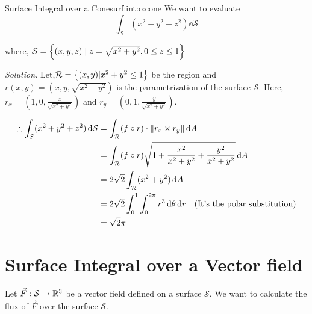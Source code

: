 \documentclass[../Analysis-3.tex]{subfiles}
\begin{document}
\begin{Eg}{Surface Integral over a Cone}{surf:int:o:cone}
  We want to evaluate \[ \int_{\mathcal{S}}(x^2+y^2+z^2) \dd \mathcal{S}\]

  where, $\mathcal{S} = \qty{(x,y,z) \mid z = \sqrt{x^2 + y^2},0 \le z \le 1}$

  \textit{Solution.} Let,$\mathcal{R} = \qty{(x,y)| x^2+y^2 \le 1}$ be the region and $r(x,y) = \left( x,y,\sqrt{x^2+y^2} \right)$ is the parametrization of the surface $\mathcal{S}$. Here, $r_x = \left( 1,0, \frac{x}{\sqrt{x^2+y^2}} \right)$ and $r_y = \left( 0,1,\frac{y}{\sqrt{x^2+y^2}} \right)$.


  \begin{align*}
    \therefore \int_{\mathcal{S}}(x^2+y^2+z^2) \, \dd \mathcal{S}
     & = \int_{\mathcal{R}} (f\circ r) \cdot \norm{r_x \times r_y} \, \dd A                                                    \\
     & = \int_{\mathcal{R}} (f\circ r) \sqrt{1 + \frac{x^2}{x^2+y^2} + \frac{y^2}{x^2+y^2}} \, \dd A                           \\
     & = 2\sqrt{2} \int_{\mathcal{R}} (x^2+y^2) \, \dd A                                                                       \\
     & = 2\sqrt{2} \int_{0}^{1} \int_{0}^{2\pi} r^3 \, \dd \theta \, \dd r \quad (\text{It's the polar substitution}) \\
     & = \sqrt{2} \pi
  \end{align*}

\end{Eg}

\section{Surface Integral over a Vector field}

Let $\vec{F} : \mathcal{S} \to \mathbb{R}^3$ be a vector field defined on a surface $\mathcal{S}$. We want to calculate the flux of $\vec{F}$ over the surface $\mathcal{S}$.
\end{document}
